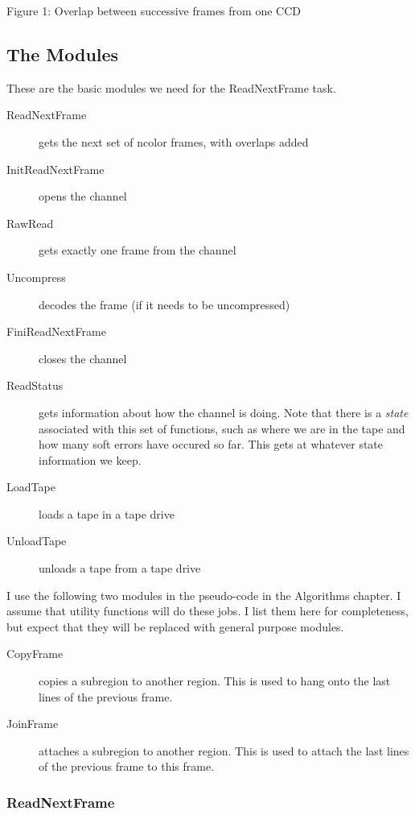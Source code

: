 \textwidth
\vskip 0.25in

Figure 1:  Overlap between successive frames from one CCD

\subsection{The Modules}

These are the basic modules we need for the ReadNextFrame task.

\begin{description}
\item[ReadNextFrame] gets the next set of ncolor frames, with overlaps added
\item[InitReadNextFrame] opens the channel
\item[RawRead] gets exactly one frame from the channel
\item[Uncompress] decodes the frame (if it needs to be uncompressed)
\item[FiniReadNextFrame] closes the channel
\item[ReadStatus] gets information about how the channel is doing.
Note that there is a {\em state} associated with this set of 
functions, such as where we are in the tape and how many soft errors
have occured so far.  This gets at whatever state information we keep.
\item[LoadTape] loads a tape in a tape drive
\item[UnloadTape] unloads a tape from a tape drive
\end{description}




I use the following two modules in the pseudo-code in the Algorithms
chapter.  I assume that utility functions will do these jobs.  I 
list them here for completeness, but expect that they will
be replaced with general purpose modules.

\begin{description}

\item[CopyFrame] copies a subregion to another region.  This is used
to hang onto the last lines of the previous frame.

\item[JoinFrame] attaches a subregion to another region.  This is used
to attach the last lines of the previous frame to this frame.

\end{description}


\subsubsection{ReadNextFrame}

